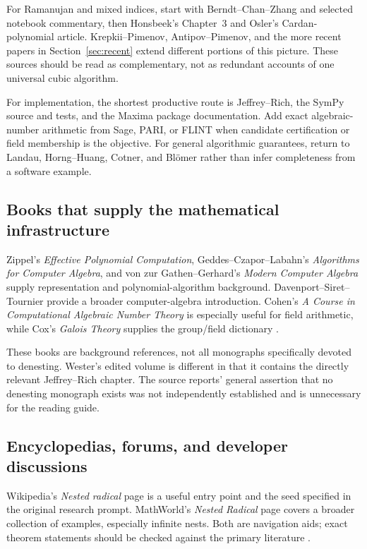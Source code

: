 \documentclass[11pt,letterpaper]{article}
\numberwithin{equation}{section}
\theoremstyle{definition}
\theoremstyle{remark}
\begin{document}
For Ramanujan and mixed indices, start with Berndt--Chan--Zhang and selected notebook commentary, then Honsbeek's Chapter~3 and Osler's Cardan-polynomial article. Krepkii--Pimenov, Antipov--Pimenov, and the more recent papers in Section~\ref{sec:recent} extend different portions of this picture. These sources should be read as complementary, not as redundant accounts of one universal cubic algorithm.

For implementation, the shortest productive route is Jeffrey--Rich, the SymPy source and tests, and the Maxima package documentation. Add exact algebraic-number arithmetic from Sage, PARI, or FLINT when candidate certification or field membership is the objective. For general algorithmic guarantees, return to Landau, Horng--Huang, Cotner, and Bl\"omer rather than infer completeness from a software example.

\subsection{Books that supply the mathematical infrastructure}
Zippel's \emph{Effective Polynomial Computation}, Geddes--Czapor--Labahn's \emph{Algorithms for Computer Algebra}, and von zur Gathen--Gerhard's \emph{Modern Computer Algebra} supply representation and polynomial-algorithm background. Davenport--Siret--Tournier provide a broader computer-algebra introduction. Cohen's \emph{A Course in Computational Algebraic Number Theory} is especially useful for field arithmetic, while Cox's \emph{Galois Theory} supplies the group/field dictionary \cite{zippelbook,geddes,gathen,davenport,cohen,cox}.

These books are background references, not all monographs specifically devoted to denesting. Wester's edited volume is different in that it contains the directly relevant Jeffrey--Rich chapter. The source reports' general assertion that no denesting monograph exists was not independently established and is unnecessary for the reading guide.

\subsection{Encyclopedias, forums, and developer discussions}
Wikipedia's \emph{Nested radical} page is a useful entry point and the seed specified in the original research prompt. MathWorld's \emph{Nested Radical} page covers a broader collection of examples, especially infinite nests. Both are navigation aids; exact theorem statements should be checked against the primary literature \cite{wikipedia,mathworld}.
\end{document}
